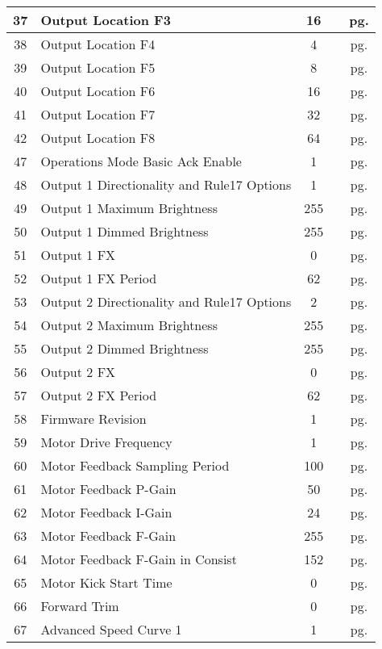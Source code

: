 \documentclass[12pt,letterpaper,draft]{memoir} %
\begin{document}
\begin{center}
\begin{longtable}{|c|l|c|c|c|}
37&Output Location F3&16&&pg. \pageref{CV37} \\ \hline
38&Output Location F4&4&&pg. \pageref{CV38} \\ \hline
39&Output Location F5&8&&pg. \pageref{CV39} \\ \hline
40&Output Location F6&16&&pg. \pageref{CV40} \\ \hline
41&Output Location F7&32&&pg. \pageref{CV41} \\ \hline
42&Output Location F8&64&&pg. \pageref{CV42} \\ \hline
47&Operations Mode Basic Ack Enable&1&&pg. \pageref{CV47} \\ \hline
48&Output 1 Directionality and Rule17 Options&1&&pg. \pageref{CV48} \\ \hline
49&Output 1 Maximum Brightness&255&&pg. \pageref{CV49} \\ \hline
50&Output 1 Dimmed Brightness&255&&pg. \pageref{CV50} \\ \hline
51&Output 1 FX&0&&pg. \pageref{CV51} \\ \hline
52&Output 1 FX Period&62&&pg. \pageref{CV52} \\ \hline
53&Output 2 Directionality and Rule17 Options&2&&pg. \pageref{CV53} \\ \hline
54&Output 2 Maximum Brightness&255&&pg. \pageref{CV54} \\ \hline
55&Output 2 Dimmed Brightness&255&&pg. \pageref{CV55} \\ \hline
56&Output 2 FX&0&&pg. \pageref{CV56} \\ \hline
57&Output 2 FX Period&62&&pg. \pageref{CV57} \\ \hline
58&Firmware Revision&1&&pg. \pageref{CV58} \\ \hline
59&Motor Drive Frequency&1&&pg. \pageref{CV59} \\ \hline
60&Motor Feedback Sampling Period&100&&pg. \pageref{CV60} \\ \hline
61&Motor Feedback P-Gain&50&&pg. \pageref{CV61} \\ \hline
62&Motor Feedback I-Gain&24&&pg. \pageref{CV62} \\ \hline
63&Motor Feedback F-Gain&255&&pg. \pageref{CV63} \\ \hline
64&Motor Feedback F-Gain in Consist&152&&pg. \pageref{CV64} \\ \hline
65&Motor Kick Start Time&0&&pg. \pageref{CV65} \\ \hline
66&Forward Trim&0&&pg. \pageref{CV66} \\ \hline
67&Advanced Speed Curve 1&1&&pg. \pageref{CV67} \\ \hline

\end{longtable}
\end{center}
\end{document}
